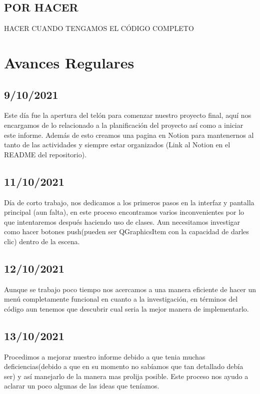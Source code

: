 \documentclass{article}
\begin{document}
    \subsection{POR HACER}
    HACER CUANDO TENGAMOS EL CÓDIGO COMPLETO
    
\section{Avances Regulares}
    \subsection{9/10/2021}
        Este día fue la apertura del telón para comenzar nuestro proyecto final, aquí nos encargamos de lo relacionado a la planificación del proyecto así como a iniciar este informe. Además de esto creamos una pagina en Notion para mantenernos al tanto de las actividades y siempre estar organizados (Link al Notion en el README del repositorio).
        
    \subsection{11/10/2021}
        Día de corto trabajo, nos dedicamos a los primeros pasos en la interfaz y pantalla principal (aun falta), en este proceso encontramos varios inconvenientes por lo que intentaremos después haciendo uso de clases. Aun necesitamos investigar como hacer botones push(pueden ser QGraphicsItem con la capacidad de darles clic) dentro de la escena.
        
    \subsection{12/10/2021}
        Aunque se trabajo poco tiempo nos acercamos a una manera eficiente de hacer un menú completamente funcional en cuanto a la investigación, en términos del código aun tenemos que descubrir cual seria la mejor manera de implementarlo.
        
    \subsection{13/10/2021}
        Procedimos a mejorar nuestro informe debido a que tenia muchas deficiencias(debido a que en su momento no sabíamos que tan detallado debía ser) y así manejarlo de la manera mas prolija posible. Este proceso nos ayudo a aclarar un poco algunas de las ideas que teníamos.
        
\end{document}
